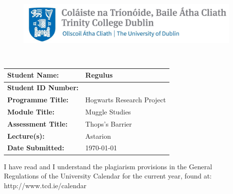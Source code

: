 \documentclass[12pt]{article} %
\begin{document}
	\begin{figure}[h]
		\centering
		\vspace{-2.5cm}
		\hspace{-8cm}
		\includegraphics[width=12cm]{Trinity_icon.jpg}  
	\end{figure}
	
	\vspace{.5cm}
	\begin{center}
		\\
	\end{center}
	
	\vspace{.7cm}
	
	\begin{center}
		\begin{tabular}{|>{\arraybackslash}p{5cm}|>{\arraybackslash}p{8cm}|}
			\hline
			\textbf{Student Name: }& Regulus\\ %
			\hline
			\textbf{Student ID Number:} & 23330530 \\ %
			\hline
			\textbf{Programme Title:} & Hogwarts Research Project \\ %
			\hline
			\textbf{Module Title: }& Muggle Studies\\ %
			\hline
			\textbf{Assessment Title:} & Thops's Barrier\\ %
			\hline
			\textbf{Lecture(s): }& Astarion \\ %
			\hline
			\textbf{Date Submitted:} & \today \\ %
			\hline
		\end{tabular}
	\end{center}
	
	\vspace{.7cm}
	
	\noindent I have read and I understand the plagiarism provisions in the General Regulations of the University Calendar for the current year, found at:  http://www.tcd.ie/calendar \\
	
\end{document}
